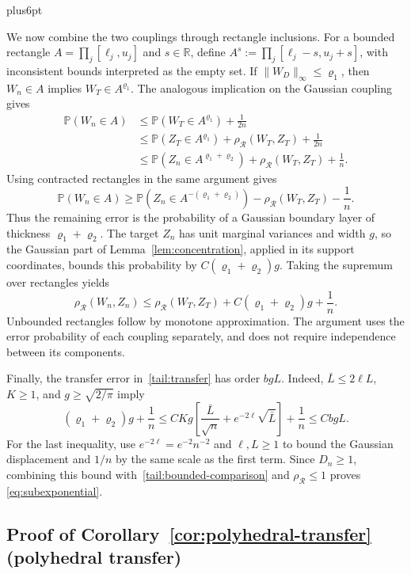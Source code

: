 \documentclass[11pt,letterpaper,twoside,leqno]{article}
\makeatletter
\theoremstyle{bookplain}
\theoremstyle{bookremark}
\renewenvironment{proof}[1][\proofname]{\par
  \pushQED{\qed}\normalfont\topsep6pt plus6pt\relax
  \trivlist\item[\hskip\labelsep\bfseries #1\@addpunct{.}]\ignorespaces
}{\popQED\endtrivlist\@endpefalse}
\newcommand{\Pp}{\mathbb P}
\newcommand{\R}{\mathbb R}
\newcommand{\rh}{\rho_{\mathcal R}}
\makeatother
\begin{document}
\begin{proof}[Proof of Corollary~\ref{cor:subexponential}]
We now combine the two couplings through rectangle inclusions.
For a bounded rectangle $A=\prod_j[\ell_j,u_j]$ and $s\in\R$,
define $A^s:=\prod_j[\ell_j-s,u_j+s]$, with inconsistent bounds
interpreted as the empty set. If $\|W_D\|_\infty\le\varrho_1$,
then $W_n\in A$ implies $W_T\in A^{\varrho_1}$.
The analogous implication on the Gaussian coupling gives
\begin{align*}
 \Pp(W_n\in A)
 &\le\Pp(W_T\in A^{\varrho_1})+\frac1{2n}\\
 &\le\Pp(Z_T\in A^{\varrho_1})+\rh(W_T,Z_T)+\frac1{2n}\\
 &\le\Pp(Z_n\in A^{\varrho_1+\varrho_2})
                         +\rh(W_T,Z_T)+\frac1n.
\end{align*}
Using contracted rectangles in the same argument gives
\[
 \Pp(W_n\in A)
 \ge\Pp(Z_n\in A^{-(\varrho_1+\varrho_2)})
                         -\rh(W_T,Z_T)-\frac1n.
\]
Thus the remaining error is the probability of a Gaussian boundary
layer of thickness $\varrho_1+\varrho_2$.
The target $Z_n$ has unit marginal variances and width $g$, so the
Gaussian part of Lemma~\ref{lem:concentration}, applied in its support
coordinates, bounds this probability by $C(\varrho_1+\varrho_2)g$.
Taking the supremum over rectangles yields
\begin{equation}
 \rh(W_n,Z_n)\le\rh(W_T,Z_T)
       +C(\varrho_1+\varrho_2)g+\frac1n.
 \label{tail:transfer}
\end{equation}
Unbounded rectangles follow by monotone approximation. The argument
uses the error probability of each coupling separately, and does not
require independence between its components.

Finally, the transfer error in~\eqref{tail:transfer} has order $bgL$.
Indeed, $\bar L\le2\ell L$, $K\ge1$, and $g\ge\sqrt{2/\pi}$ imply
\[
 (\varrho_1+\varrho_2)g+\frac1n
 \le CKg\left[\frac{\bar L}{\sqrt n}
                   +e^{-2\ell}\sqrt{\bar L}\right]+\frac1n
 \le CbgL.
\]
For the last inequality, use $e^{-2\ell}=e^{-2}n^{-2}$ and
$\ell,L\ge1$ to bound the Gaussian displacement and $1/n$ by the
same scale as the first term. Since $D_n\ge1$, combining this bound
with~\eqref{tail:bounded-comparison} and $\rh\le1$ proves
\eqref{eq:subexponential}.
\end{proof}

\subsection{Proof of Corollary~\ref*{cor:polyhedral-transfer} (polyhedral transfer)}
\label{app:polyhedral-transfer}
\end{document}
